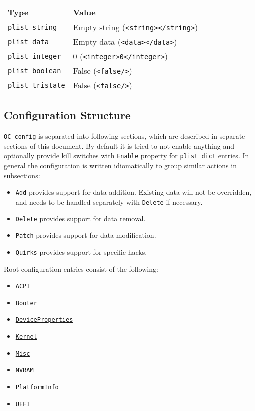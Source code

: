 \documentclass[]{article}
\providecommand{\tightlist}{%
  \setlength{\itemsep}{0pt}\setlength{\parskip}{0pt}}
\begin{document}
\begin{center}
\begin{tabular}{|l|l|}
\hline
\textbf{Type} & \textbf{Value} \\
\hline
\texttt{plist\ string} & Empty string
(\texttt{\textless{}string\textgreater{}\textless{}/string\textgreater{}}) \\
\hline
\texttt{plist\ data} & Empty data
(\texttt{\textless{}data\textgreater{}\textless{}/data\textgreater{}}) \\
\hline
\texttt{plist\ integer} & 0
(\texttt{\textless{}integer\textgreater{}0\textless{}/integer\textgreater{}}) \\
\hline
\texttt{plist\ boolean} & False
(\texttt{\textless{}false/\textgreater{}}) \\
\hline
\texttt{plist\ tristate} & False
(\texttt{\textless{}false/\textgreater{}}) \\
\hline
\end{tabular}
\end{center}

\subsection{Configuration Structure}\label{configuration-structure}

\texttt{OC\ config} is separated into following sections, which are described
in separate sections of this document. By default it is tried to not enable
anything and optionally provide kill switches with \texttt{Enable} property
for \texttt{plist dict} entries. In general the configuration is written
idiomatically to group similar actions in subsections:

\begin{itemize}
\tightlist
\item
  \texttt{Add} provides support for data addition. Existing data will
  not be overridden, and needs to be handled separately with
  \texttt{Delete} if necessary.
\item
  \texttt{Delete} provides support for data removal.
\item
  \texttt{Patch} provides support for data modification.
\item
  \texttt{Quirks} provides support for specific hacks.
\end{itemize}

Root configuration entries consist of the following:

\begin{itemize}
\tightlist
\item
  \hyperref[acpi]{\texttt{ACPI}}
\item
  \hyperref[booter]{\texttt{Booter}}
\item
  \hyperref[devprops]{\texttt{DeviceProperties}}
\item
  \hyperref[kernel]{\texttt{Kernel}}
\item
  \hyperref[misc]{\texttt{Misc}}
\item
  \hyperref[nvram]{\texttt{NVRAM}}
\item
  \hyperref[platforminfo]{\texttt{PlatformInfo}}
\item
  \hyperref[uefi]{\texttt{UEFI}}
\end{itemize}
\end{document}
